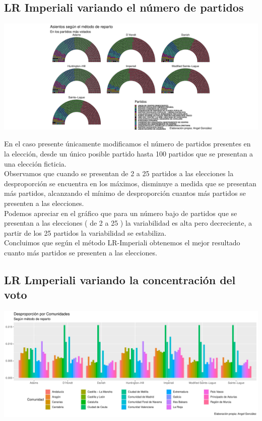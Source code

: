 \documentclass[12pt,a4paper,]{book}
\numberwithin{dummy}{section}
\theoremstyle{ocrenumbox}
\theoremstyle{blacknumex}
\theoremstyle{blacknumbox}
\theoremstyle{ocrenum}
\theoremstyle{ocrenum}
\begin{document}
\hypertarget{lr-imperiali-variando-el-nuxfamero-de-partidos}{%
\subsection{LR Imperiali variando el número de
partidos}\label{lr-imperiali-variando-el-nuxfamero-de-partidos}}

\begin{center}\includegraphics[width=0.95\linewidth]{figurasR/unnamed-chunk-62-1} \end{center}

En el caso presente únicamente modificamos el número de partidos
presentes en la elección, desde un único posible partido hasta 100
partidos que se presentan a una elección ficticia.\\
Observamos que cuando se presentan de 2 a 25 partidos a las elecciones
la desproporción se encuentra en los máximos, disminuye a medida que se
presentan más partidos, alcanzando el mínimo de desproporción cuantos
más partidos se presenten a las elecciones.\\
Podemos apreciar en el gráfico que para un número bajo de partidos que
se presentan a las elecciones ( de 2 a 25 ) la variabilidad es alta pero
decreciente, a partir de los 25 partidos la variabilidad se
estabiliza.\\
Concluimos que según el método LR-Imperiali obtenemos el mejor resultado
cuanto más partidos se presenten a las elecciones.

\hypertarget{lr-lmperiali-variando-la-concentraciuxf3n-del-voto}{%
\subsection{LR Lmperiali variando la concentración del
voto}\label{lr-lmperiali-variando-la-concentraciuxf3n-del-voto}}

\begin{center}\includegraphics[width=0.95\linewidth]{figurasR/unnamed-chunk-63-1} \end{center}
\end{document}

